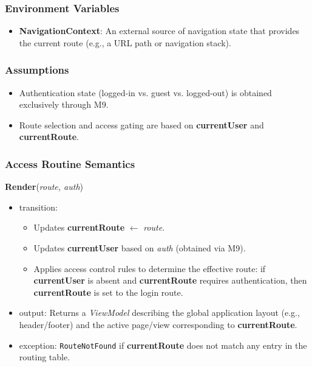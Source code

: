 \documentclass[12pt, titlepage]{article}
\begin{document}
\subsubsection{Environment Variables}
\begin{itemize}
    \item \textbf{NavigationContext}: An external source of navigation state that provides the current route (e.g., a URL path or navigation stack).
\end{itemize}

\subsubsection{Assumptions}
\begin{itemize}
    \item Authentication state (logged-in vs. guest vs. logged-out) is obtained exclusively through M9.
    \item Route selection and access gating are based on \textbf{currentUser} and \textbf{currentRoute}.
\end{itemize}

\subsubsection{Access Routine Semantics}

\noindent\textbf{Render}(\textit{route, auth})
\begin{itemize}
    \item transition:
    \begin{itemize}
        \item Updates \textbf{currentRoute} $\leftarrow$ \textit{route}.
        \item Updates \textbf{currentUser} based on \textit{auth} (obtained via M9).
        \item Applies access control rules to determine the effective route:
              if \textbf{currentUser} is absent and \textbf{currentRoute} requires authentication,
              then \textbf{currentRoute} is set to the login route.
    \end{itemize}
    \item output:
    Returns a \textit{ViewModel} describing the global application layout (e.g., header/footer)
    and the active page/view corresponding to \textbf{currentRoute}.
    \item exception: \texttt{RouteNotFound} if \textbf{currentRoute} does not match any entry in the routing table.
\end{itemize}
\end{document}

